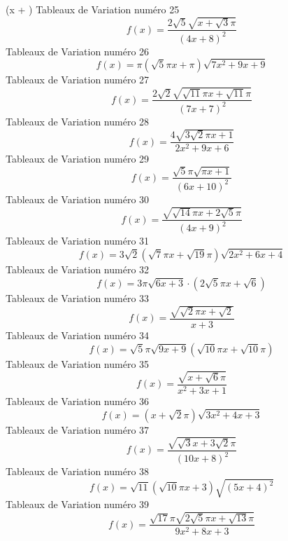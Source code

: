 \documentclass{article}
\begin{document}
 \left(\pi x + \right) \]Tableaux de Variation num\'ero 25 \[f(x) = \frac{2 \sqrt{5} \sqrt{x + \sqrt{3} \pi}}{\left(4 x + 8\right)^{2}}\]Tableaux de Variation num\'ero 26 \[f(x) = \pi \left(\sqrt{5} \pi x + \pi\right) \sqrt{7 x^{2} + 9 x + 9}\]Tableaux de Variation num\'ero 27 \[f(x) = \frac{2 \sqrt{2} \sqrt{\sqrt{11} \pi x + \sqrt{11} \pi}}{\left(7 x + 7\right)^{2}}\]Tableaux de Variation num\'ero 28 \[f(x) = \frac{4 \sqrt{3 \sqrt{2} \pi x + 1}}{2 x^{2} + 9 x + 6}\]Tableaux de Variation num\'ero 29 \[f(x) = \frac{\sqrt{5} \pi \sqrt{\pi x + 1}}{\left(6 x + 10\right)^{2}}\]Tableaux de Variation num\'ero 30 \[f(x) = \frac{\sqrt{\sqrt{14} \pi x + 2 \sqrt{5} \pi}}{\left(4 x + 9\right)^{2}}\]Tableaux de Variation num\'ero 31 \[f(x) = 3 \sqrt{2} \left(\sqrt{7} \pi x + \sqrt{19} \pi\right) \sqrt{2 x^{2} + 6 x + 4}\]Tableaux de Variation num\'ero 32 \[f(x) = 3 \pi \sqrt{6 x + 3} \cdot \left(2 \sqrt{5} \pi x + \sqrt{6}\right)\]Tableaux de Variation num\'ero 33 \[f(x) = \frac{\sqrt{\sqrt{2} \pi x + \sqrt{2}}}{x + 3}\]Tableaux de Variation num\'ero 34 \[f(x) = \sqrt{5} \pi \sqrt{9 x + 9} \left(\sqrt{10} \pi x + \sqrt{10} \pi\right)\]Tableaux de Variation num\'ero 35 \[f(x) = \frac{\sqrt{x + \sqrt{6} \pi}}{x^{2} + 3 x + 1}\]Tableaux de Variation num\'ero 36 \[f(x) = \left(x + \sqrt{2} \pi\right) \sqrt{3 x^{2} + 4 x + 3}\]Tableaux de Variation num\'ero 37 \[f(x) = \frac{\sqrt{\sqrt{3} x + 3 \sqrt{2} \pi}}{\left(10 x + 8\right)^{2}}\]Tableaux de Variation num\'ero 38 \[f(x) = \sqrt{11} \left(\sqrt{10} \pi x + 3\right) \sqrt{\left(5 x + 4\right)^{2}}\]Tableaux de Variation num\'ero 39 \[f(x) = \frac{\sqrt{17} \pi \sqrt{2 \sqrt{5} \pi x + \sqrt{13} \pi}}{9 x^{2} + 8 x + 3}\]
\end{document}
